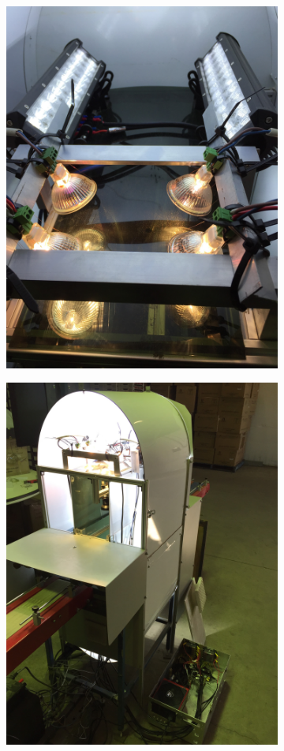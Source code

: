 \documentclass[fleqn,twoside,12pt]{report}
\begin{document}
\begin{figure}[ht]
	\centering
	\begin{subfigure}{.5\textwidth}
		\centering
		\includegraphics[width=.8\linewidth, angle=270]{halogen.jpg}
		\caption{}
		\label{fig:halogen}
	\end{subfigure}%
	\begin{subfigure}{.5\textwidth}
		\centering
		\includegraphics[width=.8\linewidth, angle=270]{system_construct_3.jpg}
		\caption{}
		\label{fig:lights_power}
	\end{subfigure}%


\end{figure}
\end{document}
